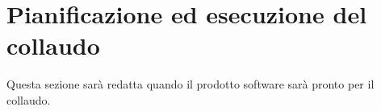 %


\section{Pianificazione ed esecuzione del collaudo}
	Questa sezione sarà redatta quando il prodotto software sarà pronto per il collaudo.
	
	\pagebreak